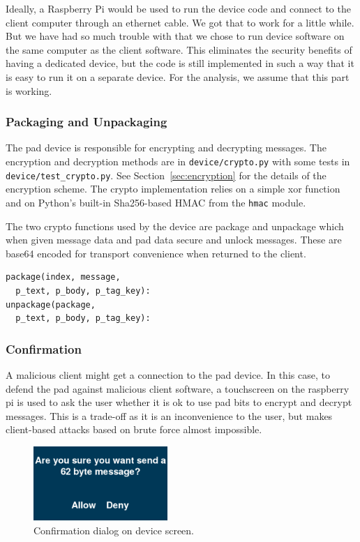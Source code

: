 \documentclass[twocolumn]{article}
\begin{document}
Ideally, a Raspberry Pi would be used to run the device code and connect to the client computer through an ethernet cable. We got that to work for a little while. But we have had so much trouble with that we chose to run device software on the same computer as the client software. This eliminates the security benefits of having a dedicated device, but the code is still implemented in such a way that it is easy to run it on a separate device. For the analysis, we assume that this part is working.


\subsubsection{Packaging and Unpackaging}
The pad device is responsible for encrypting and decrypting messages. The encryption and decryption methods are in \texttt{device/crypto.py} with some tests in \texttt{device/test\_crypto.py}. See Section~\ref{sec:encryption} for the details of the encryption scheme. The crypto implementation relies on a simple xor function and on Python's built-in Sha256-based HMAC from the \texttt{hmac} module.

The two crypto functions used by the device are package and unpackage which when given message
data and pad data secure and unlock messages. These are base64 encoded for transport convenience when
returned to the client.

\begin{lstlisting}
package(index, message,
  p_text, p_body, p_tag_key):
unpackage(package,
  p_text, p_body, p_tag_key):
\end{lstlisting}

\subsubsection{Confirmation}
A malicious client might get a connection to the pad device. In this case, to defend the pad against malicious client software, a touchscreen on the raspberry pi is used to ask the user whether it is ok to use pad bits to encrypt and decrypt messages. This is a trade-off as it is an inconvenience to the user, but makes client-based attacks based on brute force almost impossible.

\begin{figure}[htp]
\centering
\includegraphics[width=2in]{confirm}
\caption{Confirmation dialog on device screen.}
\end{figure}
\end{document}
